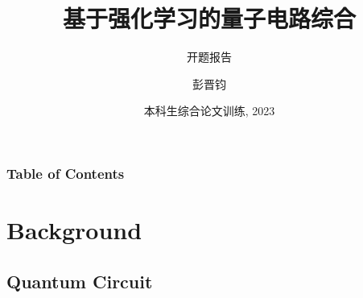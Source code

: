 \documentclass{beamer}
\title[RL x Quantum] %
{基于强化学习的量子电路综合}
\subtitle{开题报告}
\author[] %
{彭晋钧\inst{1}}
\institute[VFU] %
{
  \inst{1}%
  计算机科学与技术系\\
  清华大学\\
  \vspace{1em}
  指导教师：韩文弢\\
  校外指导：Zhihao Jia (CMU)
}
\date[2023] %
{本科生综合论文训练, 2023}
\begin{document}

\frame{\titlepage}


\begin{frame}
\frametitle{Table of Contents}
\tableofcontents
\end{frame}

\section{Background}

\subsection{Quantum Circuit}
\end{document}
